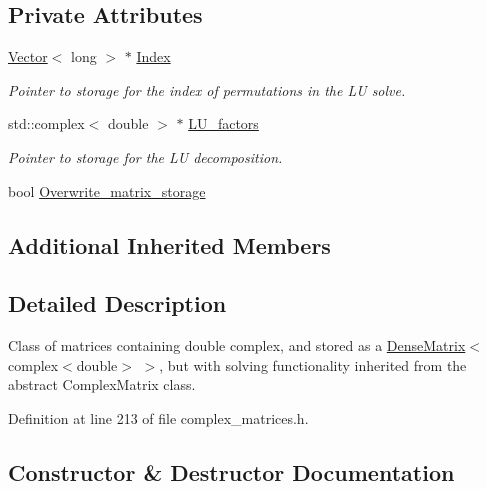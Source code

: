 \subsection*{Private Attributes}
\begin{DoxyCompactItemize}
\item 
\hyperlink{classoomph_1_1Vector}{Vector}$<$ long $>$ $\ast$ \hyperlink{classoomph_1_1DenseComplexMatrix_a477e3c52ed0b3bca35213d12f615050d}{Index}
\begin{DoxyCompactList}\small\item\em Pointer to storage for the index of permutations in the LU solve. \end{DoxyCompactList}\item 
std\+::complex$<$ double $>$ $\ast$ \hyperlink{classoomph_1_1DenseComplexMatrix_ae14fa899e9257ee36e4d251502886f25}{L\+U\+\_\+factors}
\begin{DoxyCompactList}\small\item\em Pointer to storage for the LU decomposition. \end{DoxyCompactList}\item 
bool \hyperlink{classoomph_1_1DenseComplexMatrix_a0ae372ffdc13620ac561baf9a8d0cbf0}{Overwrite\+\_\+matrix\+\_\+storage}
\end{DoxyCompactItemize}
\subsection*{Additional Inherited Members}


\subsection{Detailed Description}
Class of matrices containing double complex, and stored as a \hyperlink{classoomph_1_1DenseMatrix}{Dense\+Matrix}$<$complex$<$double$>$ $>$, but with solving functionality inherited from the abstract Complex\+Matrix class. 

Definition at line 213 of file complex\+\_\+matrices.\+h.



\subsection{Constructor \& Destructor Documentation}
\mbox{\label{classoomph_1_1DenseComplexMatrix_ad199664c8603ef3da91c76c3347d84d4}} 
